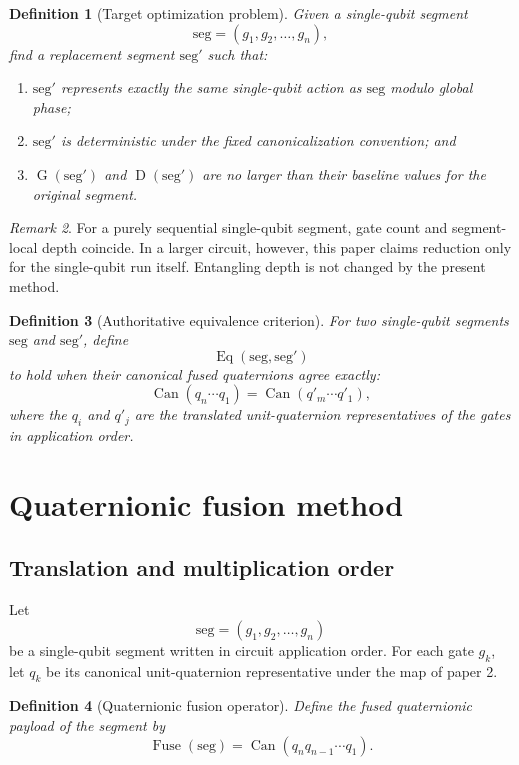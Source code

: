 \documentclass[11pt]{article}
\newtheorem{definition}{Definition}[section]
\theoremstyle{remark}
\newtheorem{remark}[definition]{Remark}
\newcommand{\canon}{\operatorname{Can}}
\newcommand{\Fuse}{\operatorname{Fuse}}
\newcommand{\GateCount}{\operatorname{G}}
\newcommand{\Depth}{\operatorname{D}}
\newcommand{\Eq}{\operatorname{Eq}}
\begin{document}
\begin{definition}[Target optimization problem]
Given a single-qubit segment
\[
\mathrm{seg}=(g_1,g_2,\dots,g_n),
\]
find a replacement segment $\mathrm{seg}'$ such that:
\begin{enumerate}[label=(\alph*), leftmargin=1.5em]
\item $\mathrm{seg}'$ represents exactly the same single-qubit action as
$\mathrm{seg}$ modulo global phase;
\item $\mathrm{seg}'$ is deterministic under the fixed canonicalization
convention; and
\item $\GateCount(\mathrm{seg}')$ and $\Depth(\mathrm{seg}')$ are no larger than
their baseline values for the original segment.
\end{enumerate}
\end{definition}

\begin{remark}
For a purely sequential single-qubit segment, gate count and segment-local depth
coincide. In a larger circuit, however, this paper claims reduction only for the
single-qubit run itself. Entangling depth is not changed by the present method.
\end{remark}

\begin{definition}[Authoritative equivalence criterion]
For two single-qubit segments $\mathrm{seg}$ and $\mathrm{seg}'$, define
\[
\Eq(\mathrm{seg},\mathrm{seg}')
\]
to hold when their canonical fused quaternions agree exactly:
\[
\canon(q_n\cdots q_1)=\canon(q'_m\cdots q'_1),
\]
where the $q_i$ and $q'_j$ are the translated unit-quaternion representatives of
the gates in application order.
\end{definition}

\section{Quaternionic fusion method}

\subsection{Translation and multiplication order}

Let
\[
\mathrm{seg}=(g_1,g_2,\dots,g_n)
\]
be a single-qubit segment written in circuit application order. For each gate
$g_k$, let $q_k$ be its canonical unit-quaternion representative under the map
of paper 2.

\begin{definition}[Quaternionic fusion operator]
Define the fused quaternionic payload of the segment by
\[
\Fuse(\mathrm{seg})=\canon(q_n q_{n-1}\cdots q_1).
\label{eq:fuse}
\]
\end{definition}
\end{document}
